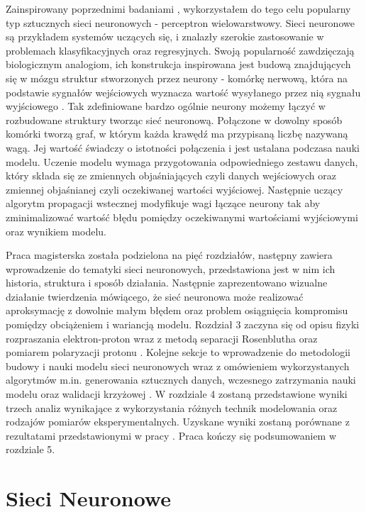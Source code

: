\documentclass[11pt]{book}
\theoremstyle{definition}
\begin{document}
Zainspirowany poprzednimi badaniami \cite{2009PhRvC..79f5204A}, \cite{PhysRevC.84.034314} wykorzystałem do tego celu popularny typ sztucznych sieci neuronowych - perceptron wielowarstwowy. Sieci neuronowe są przykładem systemów uczących się, i znalazły szerokie zastosowanie w problemach klasyfikacyjnych oraz regresyjnych. Swoją popularność zawdzięczają biologicznym analogiom, ich konstrukcja inspirowana jest budową znajdujących się w mózgu struktur stworzonych przez neurony - komórkę nerwową, która na podstawie sygnałów wejściowych wyznacza wartość wysyłanego przez nią sygnału wyjściowego \cite{1957Rosenblatt}. Tak zdefiniowane bardzo ogólnie neurony możemy łączyć w rozbudowane struktury tworząc sieć neuronową. Połączone w dowolny sposób komórki tworzą graf, w którym każda krawędź ma przypisaną liczbę nazywaną wagą. Jej wartość świadczy o istotności połączenia i jest ustalana podczasa nauki modelu. Uczenie modelu wymaga przygotowania odpowiedniego zestawu danych, który składa się ze zmiennych objaśniających czyli danych wejściowych oraz zmiennej objaśnianej czyli oczekiwanej wartości wyjściowej. Następnie uczący algorytm propagacji wstecznej modyfikuje wagi łączące neurony tak aby zminimalizować wartość błędu pomiędzy oczekiwanymi wartościami wyjściowymi oraz wynikiem modelu. 

Praca magisterska została podzielona na pięć rozdziałów, następny zawiera wprowadzenie do tematyki sieci neuronowych, przedstawiona jest w nim ich historia, struktura i sposób działania. Następnie zaprezentowano wizualne działanie twierdzenia mówiącego, że sieć neuronowa może realizować aproksymację z dowolnie małym błędem oraz problem osiągnięcia kompromisu pomiędzy obciążeniem i wariancją modelu. Rozdział 3 zaczyna się od opisu fizyki rozpraszania elektron-proton wraz z metodą separacji Rosenblutha \cite{PhysRev.79.615} oraz pomiarem polaryzacji protonu \cite{Akhiezer:1974em}. Kolejne sekcje to wprowadzenie do metodologii budowy i nauki modelu sieci neuronowych wraz z omówieniem wykorzystanych algorytmów m.in. generowania sztucznych danych, wczesnego zatrzymania nauki modelu oraz walidacji krzyżowej . W rozdziale 4 zostaną przedstawione wyniki trzech analiz wynikające z wykorzystania różnych technik modelowania oraz rodzajów pomiarów eksperymentalnych. Uzyskane wyniki zostaną porównane z rezultatami przedstawionymi w pracy \cite{PhysRevC.84.034314}. Praca kończy się podsumowaniem w rozdziale 5.



\chapter{Sieci Neuronowe}
\label{sieci}
\end{document}
